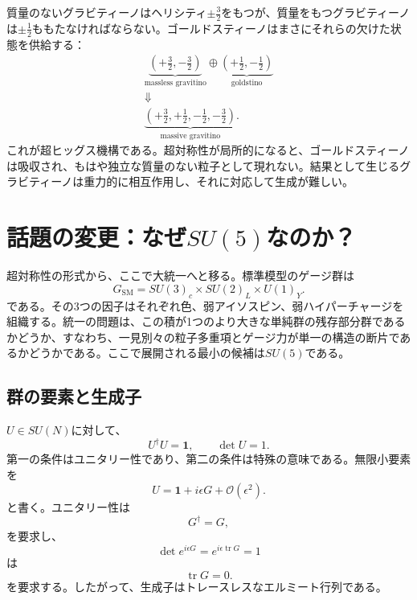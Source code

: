 質量のないグラビティーノはヘリシティ\(\pm\tfrac32\)をもつが、質量をもつグラビティーノは\(\pm\tfrac12\)ももたなければならない。ゴールドスティーノはまさにそれらの欠けた状態を供給する：
\begin{equation}
\begin{gathered}
\underbrace{\left(+\frac32,-\frac32\right)}_{\text{massless gravitino}}
\oplus
\underbrace{\left(+\frac12,-\frac12\right)}_{\text{goldstino}}\\
\Downarrow\\
\underbrace{\left(+\frac32,+\frac12,-\frac12,-\frac32\right)}_{\text{massive gravitino}}.
\end{gathered}
\label{eq:l9-super-higgs}
\end{equation}
これが超ヒッグス機構である。超対称性が局所的になると、ゴールドスティーノは吸収され、もはや独立な質量のない粒子として現れない。結果として生じるグラビティーノは重力的に相互作用し、それに対応して生成が難しい。

\section{話題の変更：なぜ\texorpdfstring{\(SU(5)\)}{SU(5)}なのか？}

超対称性の形式から、ここで大統一へと移る。標準模型のゲージ群は
\begin{equation}
G_{\mathrm{SM}}
=SU(3)_c\times SU(2)_L\times U(1)_Y.
\label{eq:l9-sm-group}
\end{equation}
である。その3つの因子はそれぞれ色、弱アイソスピン、弱ハイパーチャージを組織する。統一の問題は、この積が1つのより大きな単純群の残存部分群であるかどうか、すなわち、一見別々の粒子多重項とゲージ力が単一の構造の断片であるかどうかである。ここで展開される最小の候補は\(SU(5)\)である。

\subsection{群の要素と生成子}

\(U\in SU(N)\)に対して、
\begin{equation}
U^\dagger U=\mathbf1,
\qquad
\det U=1.
\label{eq:l9-SUN-def}
\end{equation}
第一の条件はユニタリー性であり、第二の条件は特殊の意味である。無限小要素を
\begin{equation}
U=\mathbf1+i\epsilon G+\mathcal O(\epsilon^2).
\label{eq:l9-infinitesimal-U}
\end{equation}
と書く。ユニタリー性は
\begin{equation}
G^\dagger=G,
\end{equation}
を要求し、
\begin{equation}
\det e^{i\epsilon G}
=e^{i\epsilon\operatorname{tr}G}=1
\end{equation}
は
\begin{equation}
\operatorname{tr}G=0.
\end{equation}
を要求する。したがって、生成子はトレースレスなエルミート行列である。

